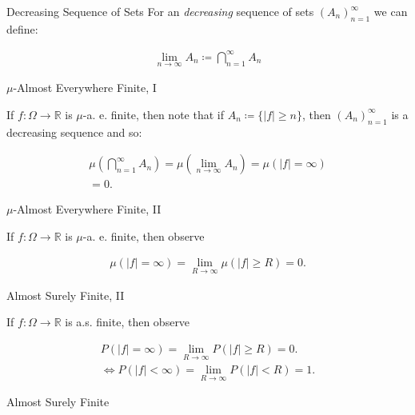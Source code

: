 \documentclass[10pt,landscape]{article}
\renewcommand{\geq}{\geqslant}
\begin{document}
\begin{multicols}{3}
\begin{observation}{}{Decreasing Sequence of Sets}
    For an \emph{decreasing} sequence of sets $(A_n)_{n=1}^{\infty}$ we can define:

        \begin{align*}
            \lim_{n \to \infty} A_n \coloneqq \bigcap_{n=1}^{\infty} A_n
        \end{align*}

\end{observation}

\begin{observation}{}{$\mu$-Almost Everywhere Finite, I}

    If $f: \Omega \to \mathbb{R}$ is $\mu$-a. e. finite, then note that if $A_n \coloneqq \{ |f| \geq n \}$, then $(A_n)_{n=1}^{\infty}$ is a decreasing sequence and so:

        \begin{align*}
            \mu\left(\bigcap_{n=1}^{\infty} A_n\right) = \mu\left(\lim_{n \to \infty} A_n\right) = \mu(|f| = \infty) \\ = 0.
        \end{align*}

\end{observation}

\begin{observation}{}{$\mu$-Almost Everywhere Finite, II}

    If $f: \Omega \to \mathbb{R}$ is $\mu$-a. e. finite, then observe

        \begin{align*}
            \mu(|f| = \infty) = \lim_{R \to \infty} \mu(|f| \geq R) = 0.
        \end{align*}

\end{observation}

\begin{observation}{}{Almost Surely Finite, II}

    If $f: \Omega \to \mathbb{R}$ is a.s. finite, then observe

        \begin{align*}
            P(|f| = \infty) = \lim_{R \to \infty} P(|f| \geq R) = 0. \\
            \iff P(|f| < \infty) = \lim_{R \to \infty} P(|f| < R) = 1.
        \end{align*}

\end{observation}

\begin{observation}{}{Almost Surely Finite}


\end{observation}
\end{multicols}
\end{document}
